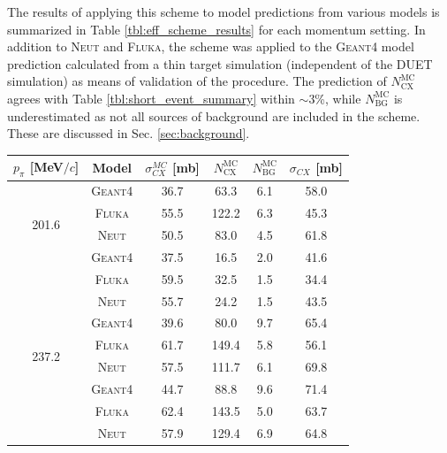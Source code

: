 The results of applying this scheme to model predictions from various models is summarized in Table \ref{tbl:eff_scheme_results} for each momentum setting. In addition to \textsc{Neut} and \textsc{Fluka}, the scheme was applied to the \textsc{Geant4} model prediction calculated from a thin target simulation (independent of the DUET simulation) as means of validation of the procedure. The prediction of $N_{\mathrm{CX}}^{\mathrm{MC}}$ agrees with Table \ref{tbl:short_event_summary} within $\sim$3\%, while $N_{\mathrm{BG}}^{\mathrm{MC}}$ is underestimated as not all sources of background are included in the scheme. These are discussed in Sec. \ref{sec:background}.
\begin{table}[htbp]
\begin{center}
\begin{tabular}{c|c|c|c|c|c}
\hline
$p_{\pi}$ [MeV$/c$] & Model & $\sigma_{CX}^{MC}$ [mb] &  $N_{\mathrm{CX}}^{\mathrm{MC}}$  &  $N_{\mathrm{BG}}^{\mathrm{MC}}$  &  $\sigma_{CX}$ [mb] \\ \hline
\multirow{4}{*}{201.6} %
& \textsc{Geant4} & 36.7 & 63.3 & 6.1 & 58.0 \\
& \textsc{Fluka} & 55.5 & 122.2 & 6.3 & 45.3 \\
& \textsc{Neut} & 50.5 & 83.0 & 4.5 & 61.8 \\ \hline

\multirow{4}{*}{216.6} %
& \textsc{Geant4} & 37.5 & 16.5 & 2.0 & 41.6 \\
& \textsc{Fluka} & 59.5 & 32.5 & 1.5 & 34.4  \\
& \textsc{Neut} & 55.7 & 24.2 & 1.5 & 43.5 \\ \hline

\multirow{4}{*}{237.2} %
& \textsc{Geant4} & 39.6 & 80.0 & 9.7 & 65.4 \\
& \textsc{Fluka} & 61.7 & 149.4 & 5.8 & 56.1 \\
& \textsc{Neut} & 57.5 & 111.7 & 6.1 & 69.8 \\ \hline

\multirow{4}{*}{265.5} %
& \textsc{Geant4} & 44.7 & 88.8 & 9.6 & 71.4 \\
& \textsc{Fluka} & 62.4 & 143.5 & 5.0 & 63.7 \\
& \textsc{Neut} & 57.9 & 129.4 & 6.9 & 64.8 \\ \hline


\end{tabular}
\end{center}
\end{table}
